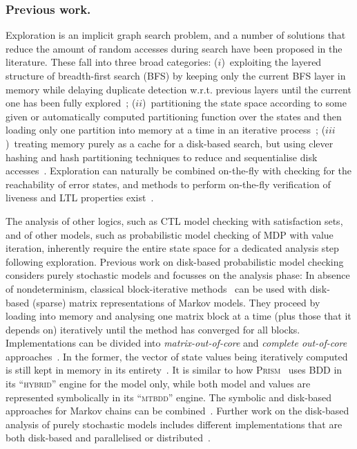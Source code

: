 \documentclass{llncs}
\newcommand{\wrt}{w.r.t.\xspace}
\newcommand{\prism}{\textsc{Prism}\xspace}
\begin{document}
\subsubsection{Previous work.}
Exploration is an implicit graph search problem, and a number of solutions that reduce the amount of random accesses during search have been proposed in the literature.
These fall into three broad categories:
($i$)~exploiting the layered structure of breadth-first search (BFS) by keeping only the current BFS layer in memory while delaying duplicate detection \wrt previous layers until the current one has been fully explored~\cite{PITZ02,SD98};
($ii$)~partitioning the state space according to some given or automatically computed partitioning function over the states and then loading only one partition into memory at a time in an iterative process~\cite{BJ05,EK13};
($iii$)~treating memory purely as a cache for a disk-based search, but using clever hashing and hash partitioning techniques to reduce and sequentialise disk accesses~\cite{HW06}.
Exploration can naturally be combined on-the-fly with checking for the reachability of error states, and methods to perform on-the-fly verification of liveness and LTL properties exist~\cite{BBS07,EJ06,ESS08}.

The analysis of other logics, such as CTL model checking with satisfaction sets, and of other models, such as probabilistic model checking of MDP with value iteration, inherently require the entire state space for a dedicated analysis step following exploration.
Previous work on disk-based probabilistic model checking considers purely stochastic models and focusses on the analysis phase:
In absence of nondeterminism, classical block-iterative methods~\cite{Ste94} can be used  with disk-based (sparse) matrix representations of Markov models. They proceed by  loading into memory and analysing one matrix block at a time (plus those that it depends on) iteratively until the method has converged for all blocks.
Implementations can be divided into \emph{matrix-out-of-core} and \emph{complete out-of-core} approaches~\cite{Meh04}.
In the former, the vector of state values being iteratively computed is still kept in memory in its entirety~\cite{DS97}.
It is similar to how \prism~\cite{KNP11} uses BDD in its ``\textsc{hybrid}'' engine for the model only, while both model and values are represented symbolically in its ``\textsc{mtbdd}'' engine.
The symbolic and disk-based approaches for Markov chains can be combined~\cite{KMNP02}.
Further work on the disk-based analysis of purely stochastic models includes different implementations that are both disk-based and parallelised or distributed~\cite{BH06,HK99}.
\end{document}
